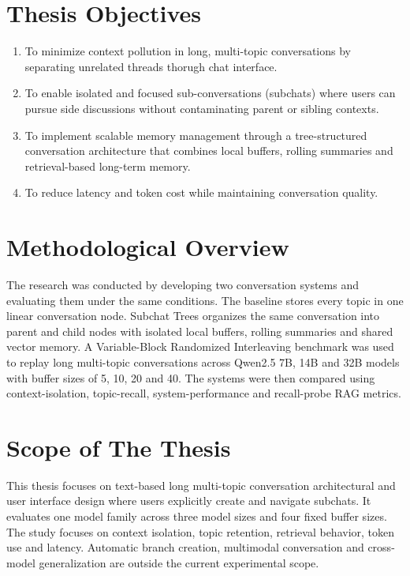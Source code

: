\section{Thesis Objectives}\label{subsec:objectives}
\begin{enumerate}
    \item To minimize context pollution in long, multi-topic conversations by separating unrelated threads thorugh chat interface.



    \item To enable isolated and focused sub-conversations (subchats) where users can pursue side discussions without contaminating parent or sibling contexts.
    \item To implement scalable memory management through a tree-structured conversation architecture that combines local buffers, rolling summaries and retrieval-based long-term memory.
    
    
    \item To reduce latency and token cost while maintaining conversation quality.

\end{enumerate}

\section{Methodological Overview}
The research was conducted by developing two conversation systems and evaluating them under the same conditions. The baseline stores every topic in one linear conversation node. Subchat Trees organizes the same conversation into parent and child nodes with isolated local buffers, rolling summaries and shared vector memory. A Variable-Block Randomized Interleaving benchmark was used to replay long multi-topic conversations across Qwen2.5 7B, 14B and 32B models with buffer sizes of 5, 10, 20 and 40. The systems were then compared using context-isolation, topic-recall, system-performance and recall-probe RAG metrics.

\section{Scope of The Thesis}
This thesis focuses on text-based long multi-topic conversation architectural and user interface design where users explicitly create and navigate subchats. It evaluates one model family across three model sizes and four fixed buffer sizes. The study focuses on context isolation, topic retention, retrieval behavior, token use and latency. Automatic branch creation, multimodal conversation and cross-model generalization are outside the current experimental scope.

